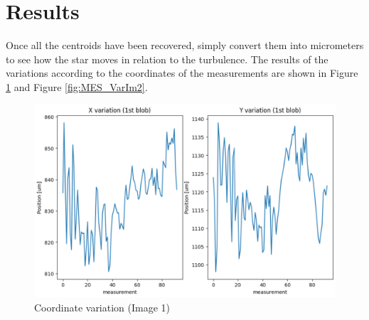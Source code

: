 \section{Results}
Once all the centroids have been recovered, simply convert them into micrometers to see how the star moves in relation to the turbulence.
\newline
The results of the variations according to the coordinates of the measurements are shown in Figure \ref{fig:MES_VarIm1} and Figure \ref{fig:MES_VarIm2}.
\begin{figure}[H]
    \centering
    \includegraphics[scale=0.6]{assets/figures/MesuresResultats/VariationImage1.png}
    \caption{Coordinate variation (Image 1)}
    \label{fig:MES_VarIm1}
\end{figure}

